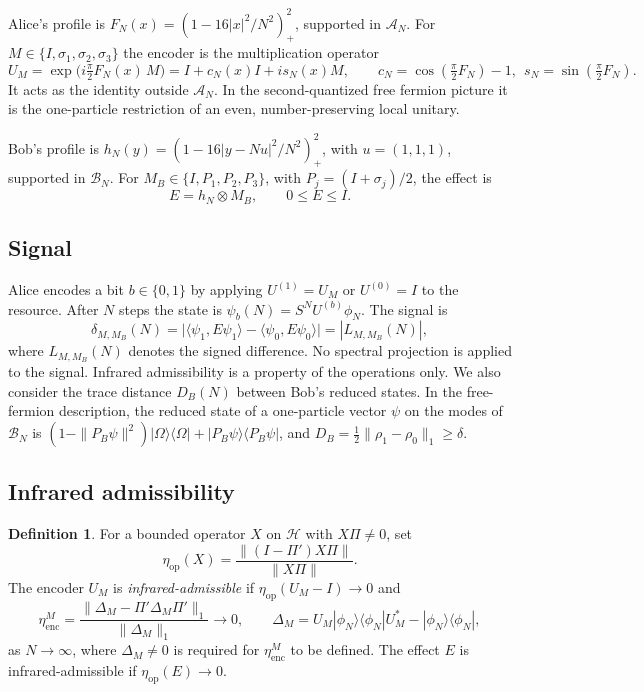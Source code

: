 \documentclass[11pt]{amsart}
\theoremstyle{definition}
\newtheorem{definition}[theorem]{Definition}
\theoremstyle{remark}
\newcommand{\cA}{\mathcal{A}}
\newcommand{\cB}{\mathcal{B}}
\begin{document}
Alice's profile is $F_N(x)=(1-16|x|^2/N^2)_+^2$, supported in $\cA_N$.  For
$M\in\{I,\sigma_1,\sigma_2,\sigma_3\}$ the encoder is the multiplication
operator
\[
U_M=\exp\bigl(i\tfrac\pi2F_N(x)\,M\bigr)=I+c_N(x)I+is_N(x)M,
\qquad c_N=\cos(\tfrac\pi2F_N)-1,\ \ s_N=\sin(\tfrac\pi2F_N).
\]
It acts as the identity outside $\cA_N$.  In the second-quantized free
fermion picture it is the one-particle restriction of an even,
number-preserving local unitary.

Bob's profile is $h_N(y)=(1-16|y-Nu|^2/N^2)_+^2$, with $u=(1,1,1)$,
supported in $\cB_N$.
For $M_B\in\{I,P_1,P_2,P_3\}$, with $P_j=(I+\sigma_j)/2$, the effect is
\[
E=h_N\otimes M_B,\qquad 0\le E\le I .
\]

\subsection{Signal}
Alice encodes a bit $b\in\{0,1\}$ by applying $U^{(1)}=U_M$ or $U^{(0)}=I$ to
the resource.  After $N$ steps the state is
$\psi_b(N)=S^NU^{(b)}\phi_N$.  The signal is
\begin{equation}\label{eq:signal}
\delta_{M,M_B}(N)=\bigl|\langle\psi_1,E\psi_1\rangle-\langle\psi_0,E\psi_0\rangle\bigr|=|L_{M,M_B}(N)|,
\end{equation}
where $L_{M,M_B}(N)$ denotes the signed difference.  No spectral projection is
applied to the signal.  Infrared admissibility is a property of the
operations only.  We also consider the trace distance $D_B(N)$ between Bob's
reduced states.  In the free-fermion description, the reduced state of a
one-particle vector $\psi$ on the modes of $\cB_N$ is
$(1-\|P_B\psi\|^2)|\Omega\rangle\langle\Omega|+|P_B\psi\rangle\langle P_B\psi|$,
and $D_B=\frac12\|\rho_1-\rho_0\|_1\ge\delta$.

\subsection{Infrared admissibility}
\begin{definition}\label{def:admissible}
For a bounded operator $X$ on $\mathcal H$ with $X\Pi\ne0$, set
\[
\eta_{\mathrm{op}}(X)=\frac{\|(I-\Pi')X\Pi\|}{\|X\Pi\|}.
\]
The encoder $U_M$ is \emph{infrared-admissible} if
$\eta_{\mathrm{op}}(U_M-I)\to0$ and
\[
\eta_{\mathrm{enc}}^M=\frac{\|\Delta_M-\Pi'\Delta_M\Pi'\|_1}{\|\Delta_M\|_1}\to0,
\qquad \Delta_M=U_M|\phi_N\rangle\langle\phi_N|U_M^*-|\phi_N\rangle\langle\phi_N|,
\]
as $N\to\infty$, where $\Delta_M\ne0$ is required for $\eta_{\mathrm{enc}}^M$
to be defined.  The effect $E$ is infrared-admissible if
$\eta_{\mathrm{op}}(E)\to0$.
\end{definition}
\end{document}
